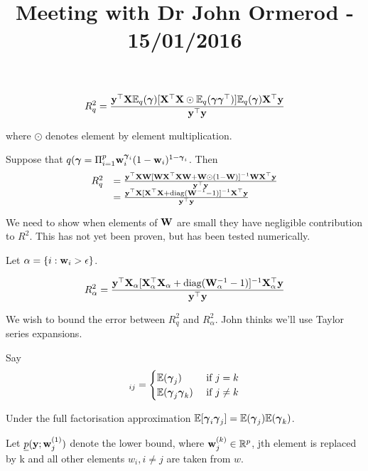 \documentclass{amsart}
\title{Meeting with Dr John Ormerod - 15/01/2016}
\begin{document}
\maketitle

\begin{equation*}
R_q^2 = \frac{{\bf y}^\top {\bf X} {\mathbb E}_q({\boldsymbol \gamma}) [{\bf X}^\top {\bf X} \odot {\mathbb E}_q({\boldsymbol \gamma} {\boldsymbol \gamma}^\top)] {\mathbb E}_q({\boldsymbol \gamma}) {\bf X}^\top {\bf y}}{{\bf y}^\top {\bf y}}
\end{equation*}

where $\odot$ denotes element by element multiplication.

Suppose that $q({\boldsymbol \gamma} = \Pi_{i=1}^p {\bf w}_i^{{\boldsymbol \gamma}_i} (1 - {\bf w}_i)^{1 - {\boldsymbol \gamma}_i}$.
Then
\begin{equation*}
\begin{array}{ll}
R_q^2 &= \frac{{\bf y}^\top {\bf X} {\bf W} [{\bf W} {\bf X}^\top {\bf X} {\bf W} + {\bf W} \odot (1 - {\bf W})]^{-1} {\bf W} {\bf X}^\top {\bf y}}{{\bf y}^\top {\bf y}} \\
&= \frac{{\bf y}^\top {\bf X} [{\bf X}^\top {\bf X} + \text{diag}{({\bf W}^{-1} - 1)}]^{-1} {\bf X}^\top {\bf y}}{{\bf y}^\top{\bf y}}
\end{array}
\end{equation*}

We need to show when elements of ${\bf W}$ are small they have negligible contribution to $R^2$. This has not yet
been proven, but has been tested numerically.

Let $\alpha = \{ i : {\bf w}_i > \epsilon \}$.

\begin{equation*}
R^2_\alpha = \frac{{\bf y}^\top {\bf X}_\alpha [{\bf X}_\alpha^\top {\bf X}_\alpha + \text{diag}{({\bf W}_{\alpha}^{-1} - 1)}]^{-1} {\bf X}_\alpha^\top {\bf y}}{{\bf y}^\top{\bf y}}
\end{equation*}

We wish to bound the error between $R_q^2$ and $R_\alpha^2$. John thinks we'll use Taylor series expansions.

Say
\begin{equation*}
[\bE(\vgamma \vgamma^\top)]_{ij} = \begin{cases}
\bE(\vgamma_j) &\text{ if } j = k\\
\bE(\vgamma_j \vgamma_k) &\text{ if } j \ne k
\end{cases}
\end{equation*}

Under the full factorisation approximation ${\mathbb E}[{\boldsymbol \gamma}_i {\boldsymbol \gamma}_j] = {\mathbb E}({\boldsymbol \gamma}_j) {\mathbb E}({\boldsymbol \gamma}_k)$.

Let $\underline{p}({\bf y}; {\bf w}_j^{(1)})$ denote the lower bound, where ${\bf w}_j^{(k)} \in {\mathbb R}^p$, jth element is
replaced by k and all other elements $w_i, i \ne j$ are taken from $w$.
\end{document}
